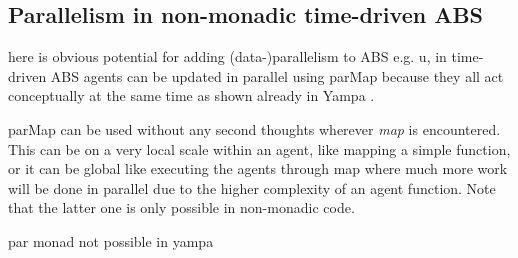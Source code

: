 \subsection{Parallelism in non-monadic time-driven ABS}
here is obvious potential for adding (data-)parallelism to ABS e.g. u, in time-driven ABS agents can be updated in parallel using parMap because they all act conceptually at the same time as shown already in Yampa \cite{perez_60_2014}.

parMap
can be used without any second thoughts wherever \textit{map} is encountered. This can be on a very local scale within an agent, like mapping a simple function, or it can be global like executing the agents through map where much more work will be done in parallel due to the higher complexity of an agent function. Note that the latter one is only possible in non-monadic code.
	

par monad not possible in yampa
